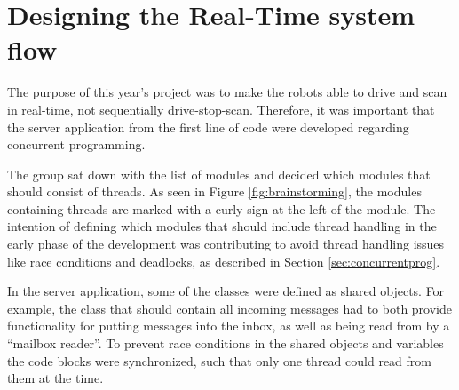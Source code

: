 \section{Designing the Real-Time system flow}
The purpose of this year's project was to make the robots able to drive and scan in real-time, not sequentially drive-stop-scan. Therefore, it was important that the server application from the first line of code were developed regarding concurrent programming.

The group sat down with the list of modules and decided which modules that should consist of threads. As seen in Figure \ref{fig:brainstorming}, the modules containing threads are marked with a curly sign at the left of the module. The intention of defining which modules that should include thread handling in the early phase of the development was contributing to avoid thread handling issues like race conditions and deadlocks, as described in Section \ref{sec:concurrentprog}.

In the server application, some of the classes were defined as shared objects. For example, the class that should contain all incoming messages had to both provide functionality for putting messages into the inbox, as well as being read from by a ``mailbox reader''. To prevent race conditions in the shared objects and variables the code blocks were synchronized, such that only one thread could read from them at the time.